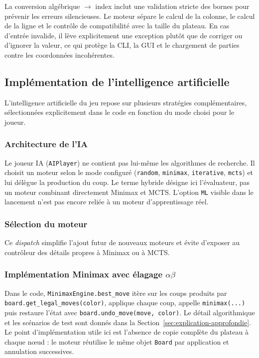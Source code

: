 \documentclass[a4paper]{article}
\begin{document}
La conversion algébrique $\rightarrow$ index inclut une validation stricte des bornes pour prévenir les erreurs silencieuses. Le moteur sépare le calcul de la colonne, le calcul de la ligne et le contrôle de compatibilité avec la taille du plateau. En cas d'entrée invalide, il lève explicitement une exception plutôt que de corriger ou d'ignorer la valeur, ce qui protège la CLI, la GUI et le chargement de parties contre les coordonnées incohérentes.


\subsection{Implémentation de l'intelligence artificielle}

L'intelligence artificielle du jeu repose sur plusieurs stratégies complémentaires, sélectionnées explicitement dans le code en fonction du mode choisi pour le joueur.

\subsubsection{Architecture de l'IA}

Le joueur IA (\texttt{AIPlayer}) ne contient pas lui-même les algorithmes de recherche. Il choisit un moteur selon le mode configuré (\texttt{random}, \texttt{minimax}, \texttt{iterative}, \texttt{mcts}) et lui délègue la production du coup. Le terme \og hybride \fg{} désigne ici l'évaluateur, pas un moteur combinant directement Minimax et MCTS. L'option \texttt{ML} visible dans le lancement n'est pas encore reliée à un moteur d'apprentissage réel.

\subsubsection{Sélection du moteur}

Ce \textit{dispatch} simplifie l'ajout futur de nouveaux moteurs et évite d'exposer au contrôleur des détails propres à Minimax ou à MCTS.

\subsubsection{Implémentation Minimax avec élagage \texorpdfstring{$\alpha\beta$}{alpha-beta}}

Dans le code, \texttt{MinimaxEngine.best\_move} itère sur les coups produits par \texttt{board.get\_legal\_moves(color)}, applique chaque coup, appelle \texttt{minimax(...)} puis restaure l'état avec \texttt{board.undo\_move(move, color)}. Le détail algorithmique et les scénarios de test sont donnés dans la Section~\ref{sec:explication-approfondie}. Le point d'implémentation utile ici est l'absence de copie complète du plateau à chaque nœud : le moteur réutilise le même objet \texttt{Board} par application et annulation successives.
\end{document}
